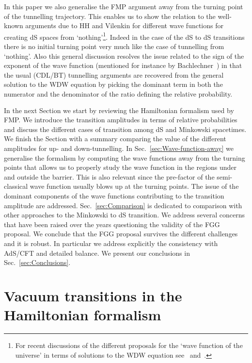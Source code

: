 \documentclass[11pt,a4paper]{article}
\begin{document}
In this paper we also generalise the FMP argument away from the turning point of the tunnelling trajectory. This enables us to 
show the relation to the well-known arguments due to HH and Vilenkin for different wave functions  for creating dS spaces from `nothing'\footnote{For recent discussions of the different proposals for the `wave function of the universe' in terms of solutions to the WDW equation see~\cite{deAlwis:2018sec} and~\cite{Halliwell:2018ejl}.}. Indeed in the case of  the dS to dS transitions there is no initial turning point very much like the case of tunnelling from `nothing'. Also this general discussion resolves the issue related to the sign of the exponent of the wave function (mentioned for instance by Bachlechner~\cite{Bachlechner:2016mtp}) in that the usual (CDL/BT) tunnelling arguments are recovered from the general solution to the WDW equation by picking the dominant term in both the numerator and the denominator of the ratio defining the relative probability.

In the next Section we start by reviewing the Hamiltonian formalism used by FMP. We introduce the transition amplitudes in terms of relative probabilities and discuss the different cases of transition among dS and Minkowski spacetimes. We finish the Section with a summary comparing the value of the different amplitudes for up- and down-tunnelling. In Sec.~\ref{sec:Wave-function-away} we generalise the formalism by computing the wave functions away from the turning points that allows us to properly study the wave function in the regions under and outside the barrier. This is also relevant since the pre-factor of the semi-classical wave function usually blows up at the turning points. The issue of the dominant components of the wave functions contributing to the transition amplitude are addressed. Sec.~\ref{sec:Comparison} is dedicated to comparison with other approaches to the Minkowski to dS transition. We address several concerns that have been raised over the years questioning the validity of the FGG proposal. We conclude that the FGG proposal survives the different challenges and it is robust. In particular we address explicitly the consistency with AdS/CFT and detailed balance. We present our conclusions in Sec.~\ref{sec:Conclusions}.

\section{ Vacuum transitions in the Hamiltonian formalism}
\label{sec:4DSummary}
\end{document}
